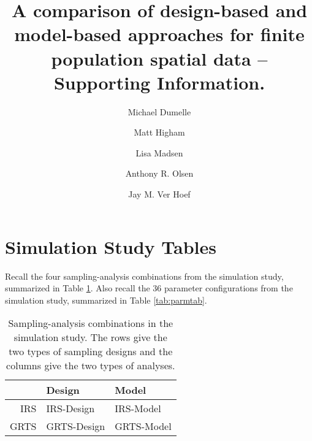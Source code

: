\documentclass[]{elsarticle} %
\begin{document}
\begin{frontmatter}

  \title{A comparison of design-based and model-based approaches for finite
population spatial data -- Supporting Information.}
    \author[USEPA]{Michael Dumelle}
  
    \author[STLAW]{Matt Higham}
  
    \author[OSU]{Lisa Madsen}
  
    \author[USEPA]{Anthony R. Olsen}
  
    \author[NOAA]{Jay M. Ver Hoef}
  
      \address[USEPA]{United States Environmental Protection Agency, 200 SW 35th St,
Corvallis, Oregon, 97333}
    \address[STLAW]{Saint Lawrence University Department of Mathematics, Computer Science,
and Statistics, 23 Romoda Drive, Canton, New York, 13617}
    \address[OSU]{Oregon State University Department of Statistics, 239 Weniger Hall,
Corvallis, Oregon, 97331}
    \address[NOAA]{Marine Mammal Laboratory, Alaska Fisheries Science Center, National
Oceanic and Atmospheric Administration, Seattle, Washington, 98115}
  
  \begin{abstract}
  
  \end{abstract}
  
 \end{frontmatter}

\hypertarget{sec:simtabs}{%
\section{Simulation Study Tables}\label{sec:simtabs}}

Recall the four sampling-analysis combinations from the simulation
study, summarized in Table \ref{tab:designanalysis}. Also recall the 36
parameter configurations from the simulation study, summarized in Table
\ref{tab:parmtab}.

\begin{table}[ht]
\centering
\begin{tabular}{r|ll}
  \hline
 & Design & Model \\ 
  \hline
IRS & IRS-Design & IRS-Model \\ 
  GRTS & GRTS-Design & GRTS-Model \\ 
   \hline
\end{tabular}
\caption{\label{tab:designanalysis} Sampling-analysis combinations in the simulation study. The rows give the two types of sampling designs and the columns give the two types of analyses.} 
\end{table}
\end{document}
